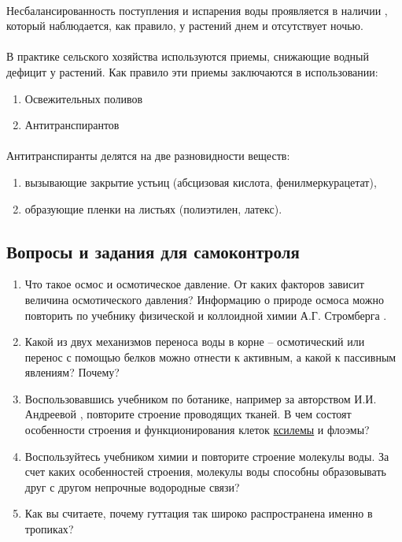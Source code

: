 \paragraph*{}Несбалансированность поступления и испарения воды проявляется в наличии , который наблюдается, как правило, у растений днем и отсутствует ночью.

\paragraph*{}В практике сельского хозяйства используются приемы, снижающие водный дефицит у растений. Как правило эти приемы заключаются в использовании: 

\begin{enumerate}
	\item Освежительных поливов
	\item Антитранспирантов
\end{enumerate}

\paragraph*{}Антитранспиранты делятся на две разновидности веществ:

\begin{enumerate}
	\item вызывающие закрытие устьиц (абсцизовая кислота, фенилмеркурацетат),
	\item образующие пленки на листьях (полиэтилен, латекс).
\end{enumerate}


\subsection*{Вопросы и задания для самоконтроля}

\begin{enumerate}
	\item Что такое осмос и \hypertarget{osmosis}{осмотическое давление}. От каких факторов зависит величина осмотического давления? Информацию о природе осмоса можно повторить по учебнику физической и коллоидной химии А.Г. Стромберга \cite{stromberg_2006}.
	\item Какой из двух \hypertarget{question_whater_trans}{механизмов} переноса воды в корне -- осмотический или перенос с помощью белков можно отнести к активным, а какой к пассивным явлениям? Почему?
	\item Воспользовавшись учебником по ботанике, например за авторством И.И. Андреевой \cite{andreeva-bot}, повторите строение проводящих тканей. В чем состоят особенности строения и функционирования клеток \hyperlink{qestion_xsilema}{ксилемы} и флоэмы?
	\item Воспользуйтесь учебником химии и повторите строение \hypertarget{question_water_mol}{молекулы воды}. За счет каких особенностей строения, молекулы воды способны образовывать друг с другом непрочные водородные связи?
	\item Как вы считаете, почему гуттация так широко распространена именно в \hypertarget{question_guttation_tropics}{тропиках}?
\end{enumerate}